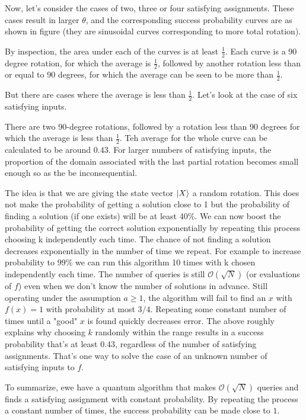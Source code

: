 Now, let's consider the cases of two, three or four satisfying assignments. These cases result in larger $\theta$, and the corresponding success probability curves are as shown in figure (they are sinusoidal curves corresponding to more total rotation).

By inspection, the area under each of the curves is at least $\frac{1}{2}$. Each curve is a 90 degree rotation, for which the average is $\frac{1}{2}$, followed by another rotation less than or equal to 90 degrees, for which the average can be seen to be more than $\frac{1}{2}$.

But there are cases where the average is less than $\frac{1}{2}$. Let's look at the case of six satisfying inputs. 

There are two 90-degree rotations, followed by a rotation less than 90 degrees for which the average is less than $\frac{1}{2}$. Teh average for the whole curve can be calculated to be around $0.43$.  For larger numbers of satisfying inputs, the proportion of the domain associated with the last partial rotation becomes small enough so as the be inconsequential.

The idea is that we are giving the state vector $\ket{X}$ a random rotation. This does not make the probability of getting a solution close to 1 but the probability of finding a solution (if one exists) will be at least 40\%. We can now boost the probability of getting the correct solution exponentially by repeating this process choosing k independently each time. The chance of not finding a solution decreases exponentially in the number of time we repeat. For example to increase probability to 99\% we can run this algorithm 10 times with k chosen independently each time. The number of queries is still $\mathcal{O}(\sqrt{N})$ (or evaluations of $f$) even when we don't know the number of solutions in advance. Still operating under the assumption $a\geq 1$, the algorithm will fail to find an $x$ with $f(x)=1$ with probability at most $3/4$. Repeating some constant number of times until a "good" $x$ is found quickly decreases error. The above roughly explains why choosing $k$ randomly within the range results in a success probability that's at least $0.43$, regardless of the number of satisfying assignments. That's one way to solve the case of an unknown number of satisfying inputs to $f$.

To summarize, ewe have a quantum algorithm that makes $\mathcal{O}(\sqrt{N})$ queries and finds a satisfying assignment with constant probability. By repeating the process a constant number of times, the success probability can be made close to $1$.

